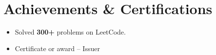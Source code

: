 \documentclass[10pt,a4paper]{article}
\begin{document}
\section{Achievements \& Certifications}
\begin{itemize}
  \item Solved \textbf{300+} problems on LeetCode.
  \item Certificate or award -- Issuer
\end{itemize}
\end{document}

